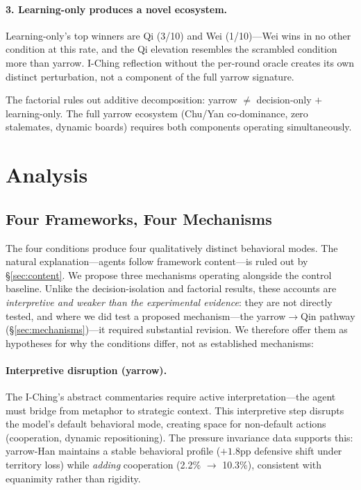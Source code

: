 \documentclass[11pt]{article}
\begin{document}
\paragraph{3. Learning-only produces a novel ecosystem.} Learning-only's top winners are Qi (3/10) and Wei (1/10)---Wei wins in no other condition at this rate, and the Qi elevation resembles the scrambled condition more than yarrow. I-Ching reflection without the per-round oracle creates its own distinct perturbation, not a component of the full yarrow signature.

The factorial rules out additive decomposition: yarrow $\neq$ decision-only $+$ learning-only. The full yarrow ecosystem (Chu/Yan co-dominance, zero stalemates, dynamic boards) requires both components operating simultaneously.


\section{Analysis}
\label{sec:analysis}

\subsection{Four Frameworks, Four Mechanisms}

The four conditions produce four qualitatively distinct behavioral modes. The natural explanation---agents follow framework content---is ruled out by \S\ref{sec:content}. We propose three mechanisms operating alongside the control baseline. Unlike the decision-isolation and factorial results, these accounts are \emph{interpretive and weaker than the experimental evidence}: they are not directly tested, and where we did test a proposed mechanism---the yarrow$\to$Qin pathway (\S\ref{sec:mechanisms})---it required substantial revision. We therefore offer them as hypotheses for why the conditions differ, not as established mechanisms:

\paragraph{Interpretive disruption (yarrow).} The I-Ching's abstract commentaries require active interpretation---the agent must bridge from metaphor to strategic context. This interpretive step disrupts the model's default behavioral mode, creating space for non-default actions (cooperation, dynamic repositioning). The pressure invariance data supports this: yarrow-Han maintains a stable behavioral profile ($+1.8$pp defensive shift under territory loss) while \emph{adding} cooperation (2.2\% $\to$ 10.3\%), consistent with equanimity rather than rigidity.
\end{document}

